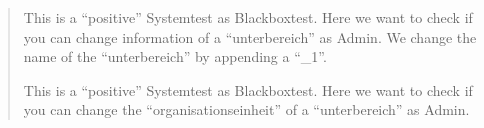 \documentclass[letterpaper,10pt,english]{sphinxmanual}
\begin{document}
\begin{quote}
\begin{fulllineitems}
\begin{fulllineitems}
This is a “positive” Systemtest as Blackboxtest.
Here we want to check if you can change information of a “unterbereich” as Admin.
We change the name of the “unterbereich” by appending a “\_1”.

\end{fulllineitems}



\begin{fulllineitems}
This is a “positive” Systemtest as Blackboxtest.
Here we want to check if you can change the “organisationseinheit” of a “unterbereich” as Admin.

\end{fulllineitems}


\end{fulllineitems}

\end{quote}
\end{document}
